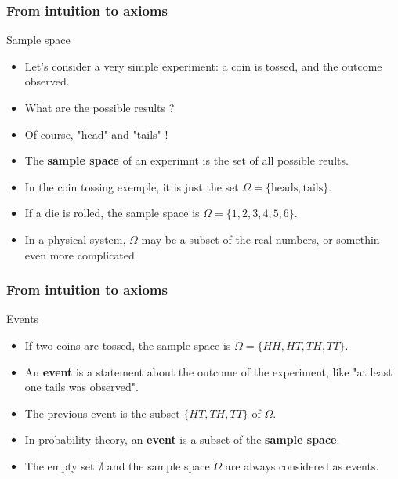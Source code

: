 \begin{frame}
    \frametitle{From intuition to axioms }
\begin{block}{Sample space}
    \begin{itemize}
        \item<+-> Let's consider a very simple experiment: a coin is tossed, and the outcome observed.
        \item<+-> What are the possible results ?
        \item<+-> Of course, "head" and "tails" !
        \item<+-> The \textbf{sample space} of an experimnt is the set of all possible reults.
        \item<+-> In the coin tossing exemple, it is just the set $\Omega = \{ \text{heads}, \text{tails}\}.$
        \item<+-> If a die is rolled, the sample space is $\Omega = \{ 1,2,3,4,5, 6\}.$
        \item<+-> In a physical system, $\Omega$ may be a subset of the real numbers,
        or somethin even more complicated.
    \end{itemize}
\end{block}    
\end{frame}
\begin{frame}
    \frametitle{From intuition to axioms}
\begin{block}{Events}
    \begin{itemize}
        \item<+-> If two coins are tossed, the sample space is 
        $\Omega = \{ HH, HT, TH, TT \}.$
        \item<+-> An \textbf{event} is a statement about the outcome of the experiment, 
        like "at least one tails was observed".
        \item<+-> The previous event is the subset $\{HT,TH,TT\}$ of $\Omega.$
        \item<+-> In probability theory, an \textbf{event} is a subset of the \textbf{sample space}.
        \item<+-> The empty set $\emptyset$ and the sample space $\Omega$ are 
        always considered as events.
    \end{itemize}
\end{block}
\end{frame}
